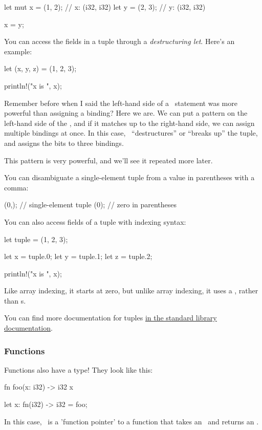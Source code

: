 \begin{rustc}
let mut x = (1, 2); // x: (i32, i32)
let y = (2, 3); // y: (i32, i32)

x = y;
\end{rustc}

You can access the fields in a tuple through a \emph{destructuring let}. Here's an example:

\begin{rustc}
let (x, y, z) = (1, 2, 3);

println!("x is {}", x);
\end{rustc}

Remember before when I said the left-hand side of a \keylet\ statement was more powerful than assigning a binding? Here we are. 
We can put a pattern on the left-hand side of the \keylet, and if it matches up to the right-hand side, we can assign multiple 
bindings at once. In this case, \keylet\ “destructures” or “breaks up” the tuple, and assigns the bits to three bindings.

\blank

This pattern is very powerful, and we'll see it repeated more later.

\blank

You can disambiguate a single-element tuple from a value in parentheses with a comma:

\begin{rustc}
(0,); // single-element tuple
(0); // zero in parentheses
\end{rustc}


You can also access fields of a tuple with indexing syntax:

\begin{rustc}
let tuple = (1, 2, 3);

let x = tuple.0;
let y = tuple.1;
let z = tuple.2;

println!("x is {}", x);
\end{rustc}

Like array indexing, it starts at zero, but unlike array indexing, it uses a , rather than \code{[]}s.

\blank

You can find more documentation for tuples \href{https://doc.rust-lang.org/std/primitive.tuple.html}{in the standard library 
documentation}.

\subsubsection*{Functions}

Functions also have a type! They look like this:

\begin{rustc}
fn foo(x: i32) -> i32 { x }

let x: fn(i32) -> i32 = foo;
\end{rustc}

In this case, \x\ is a 'function pointer' to a function that takes an \itt\ and returns an \itt.

